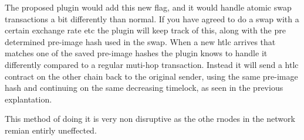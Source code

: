 The proposed plugin would add this new flag, and it would handle atomic swap transactions a bit differently than normal. If you have agreed to do a swap with a certain exchange rate etc the plugin will keep track of this, along with the pre determined pre-image hash used in the swap. When a new htlc arrives that matches one of the saved pre-image hashes the plugin knows to handle it differently compared to a regular muti-hop transaction. Instead it will send a htlc contract on the other chain back to the original sender, using the same pre-image hash and continuing on the same decreasing timelock, as seen in the previous explantation. 

This method of doing it is very non disruptive as the othe rnodes in the network remian entirly uneffected.